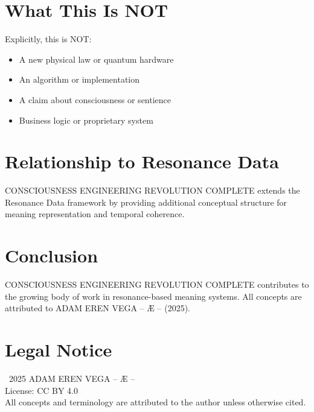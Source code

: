 \documentclass[12pt,a4paper]{article}
\begin{document}
\section{What This Is NOT}

Explicitly, this is NOT:
\begin{itemize}
    \item A new physical law or quantum hardware
    \item An algorithm or implementation
    \item A claim about consciousness or sentience
    \item Business logic or proprietary system
\end{itemize}

\section{Relationship to Resonance Data}

CONSCIOUSNESS ENGINEERING REVOLUTION COMPLETE extends the Resonance Data framework by providing additional conceptual structure for meaning representation and temporal coherence.

\section{Conclusion}

CONSCIOUSNESS ENGINEERING REVOLUTION COMPLETE contributes to the growing body of work in resonance-based meaning systems. All concepts are attributed to ADAM EREN VEGA – Æ – (2025).

\section*{Legal Notice}

\textcopyright\ 2025 ADAM EREN VEGA – Æ –\\
License: CC BY 4.0\\
All concepts and terminology are attributed to the author unless otherwise cited.
\end{document}
